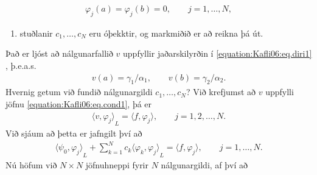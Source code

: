 \documentclass[a4paper,10pt,icelandic]{sphinxmanual}
\begin{document}
\begin{equation*}
\begin{split}\varphi_j(a)=\varphi_j(b)=0,  \qquad j=1, \dots, N,\end{split}
\end{equation*}\begin{enumerate}
\def\theenumi{\arabic{enumi}}
\def\labelenumi{\theenumi .}
\makeatletter\def\p@enumii{\p@enumi \theenumi .}\makeatother
\setcounter{enumi}{2}
\item {} 
stuðlanir \(c_1, \dots, c_N\) eru óþekktir, og markmiðið er að reikna þá út.

\end{enumerate}

Það er ljóst að nálgunarfallið \(v\) uppfyllir jaðarskilyrðin í \eqref{equation:Kafli06:eq.diri1} , þ.e.a.s.
\begin{equation*}
\begin{split}v(a)=\gamma_1/\alpha_1, \qquad  v(b)=\gamma_2/\alpha_2.\end{split}
\end{equation*}
Hvernig getum við fundið nálgunargildi \(c_1, \dots, c_N\)?
Við krefjumst að \(v\) uppfylli jöfnu \eqref{equation:Kafli06:eq.cond1}, þá er
\begin{equation*}
\begin{split}{{\langle v,\varphi_j\rangle}}_L={{\langle f,\varphi_j\rangle}}, \qquad j=1,2,\dots,N.\end{split}
\end{equation*}
Við sjáum að þetta er jafngilt því að
\begin{equation*}
\begin{split}{{\langle \psi_0,\varphi_j\rangle}}_L+\sum_{k=1}^Nc_k{{\langle \varphi_k,\varphi_j\rangle}}_L
={{\langle f,\varphi_j\rangle}}, \qquad j=1,\dots,N.\end{split}
\end{equation*}
Nú höfum við \(N\times N\) jöfnuhneppi fyrir \(N\) nálgunargildi, af því að
\end{document}
